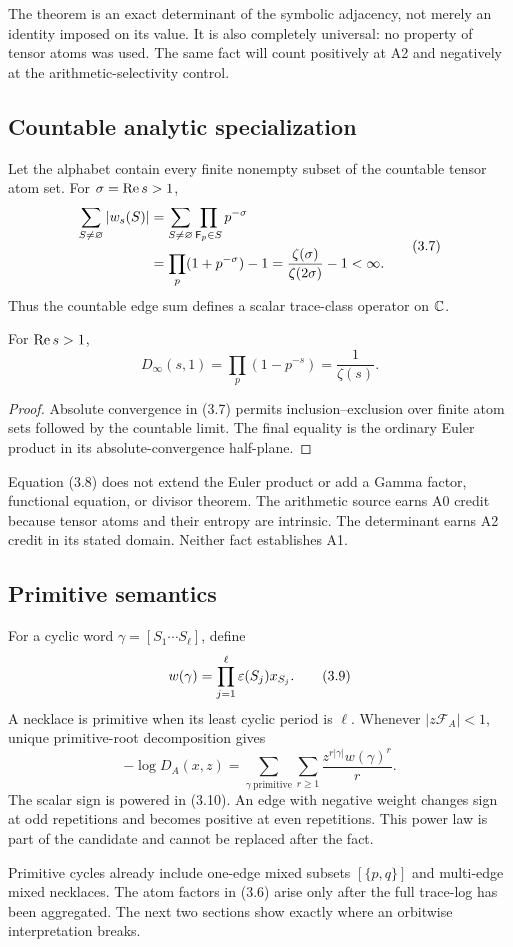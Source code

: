The theorem is an exact determinant of the symbolic adjacency, not merely an
identity imposed on its value.  It is also completely universal: no property
of tensor atoms was used.  The same fact will count positively at A2 and
negatively at the arithmetic-selectivity control.

\subsection{Countable analytic specialization}

Let the alphabet contain every finite nonempty subset of the countable tensor
atom set.  For $\sigma=\operatorname{Re} s>1$,
\[
\begin{split}
  \sum_{S\ne\varnothing}|w_s(S)|
  &=\sum_{S\ne\varnothing}\prod_{\mathsf F_p\in S}p^{-\sigma}\\
  &=\prod_p(1+p^{-\sigma})-1
   =\frac{\zeta(\sigma)}{\zeta(2\sigma)}-1<\infty.
\end{split}
\tag{3.7}
\]
Thus the countable edge sum defines a scalar trace-class operator on $\mathbb C$.

\begin{corollary}
\label{cor:countable-determinant}
For $\operatorname{Re} s>1$,
\[
  D_\infty(s,1)=\prod_p(1-p^{-s})=\frac1{\zeta(s)}.
  \tag{3.8}
\]
\end{corollary}

\begin{proof}
Absolute convergence in (3.7) permits inclusion--exclusion over finite atom
sets followed by the countable limit.  The final equality is the ordinary
Euler product in its absolute-convergence half-plane.
\end{proof}

Equation (3.8) does not extend the Euler product or add a Gamma factor,
functional equation, or divisor theorem.  The arithmetic source earns A0
credit because tensor atoms and their entropy are intrinsic.  The determinant
earns A2 credit in its stated domain.  Neither fact establishes A1.

\subsection{Primitive semantics}

For a cyclic word $\gamma=[S_1\cdots S_\ell]$, define
\[
  w(\gamma)=\prod_{j=1}^{\ell}\varepsilon(S_j)x_{S_j}.
  \tag{3.9}
\]
A necklace is primitive when its least cyclic period is $\ell$.  Whenever
$|z\mathcal F_A|<1$, unique primitive-root decomposition gives
\[
  -\log D_A(x,z)
  =\sum_{\gamma\ \mathrm{primitive}}
    \sum_{r\ge1}\frac{z^{r|\gamma|}w(\gamma)^r}{r}.
  \tag{3.10}
\]
The scalar sign is powered in (3.10).  An edge with negative weight changes
sign at odd repetitions and becomes positive at even repetitions.  This
power law is part of the candidate and cannot be replaced after the fact.

Primitive cycles already include one-edge mixed subsets $[\{p,q\}]$ and
multi-edge mixed necklaces.  The atom factors in (3.6) arise only after the
full trace-log has been aggregated.  The next two sections show exactly where
an orbitwise interpretation breaks.
